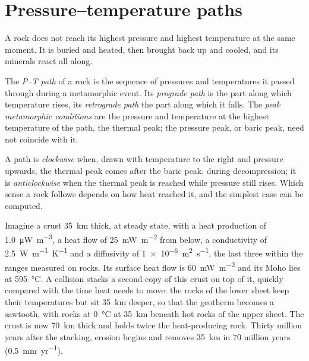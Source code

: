 \section{Pressure--temperature paths}\label{sec:b2:pt-paths:paths}

A rock does not reach its highest pressure and highest temperature at the same moment.
It is buried and heated, then brought back up and cooled, and its minerals react all
along.

\begin{definition}\label{def:b2:pt-paths:paths}
The \emph{P--T path} of a rock is the sequence of pressures and
temperatures it passed through during a metamorphic event. Its \emph{prograde
path} is the part along which temperature rises, its \emph{retrograde
path} the part along which it falls. The \emph{peak metamorphic
conditions} are the pressure and temperature at the
highest temperature of the path, the thermal peak; the pressure peak, or baric peak, need
not coincide with it.
\end{definition}

A path is \emph{clockwise} when, drawn with temperature to the right and pressure upwards,
the thermal peak comes after the baric peak, during decompression; it is
\emph{anticlockwise} when the thermal peak is reached while pressure still rises. Which
sense a rock follows depends on how heat reached it, and the simplest case can be
computed.

Imagine a crust \qty{35}{km} thick, at steady state, with a heat production of
\qty{1.0}{\micro W.m^{-3}}, a heat flow of \qty{25}{mW.m^{-2}} from below, a conductivity
of \qty{2.5}{W.m^{-1}.K^{-1}} and a diffusivity of \qty{1e-6}{m^2.s^{-1}}, the last three
within the ranges measured on rocks. Its surface heat flow is \qty{60}{mW.m^{-2}} and its Moho lies at
\qty{595}{\celsius}. A collision stacks a second copy of this crust on top of it, quickly
compared with the time heat needs to move: the rocks of the lower sheet keep their
temperatures but sit \qty{35}{km} deeper, so that the geotherm becomes a sawtooth, with
rocks at \qty{0}{\celsius} at \qty{35}{km} beneath hot rocks of the upper sheet. The crust is
now \qty{70}{km} thick and holds twice the heat-producing rock. Thirty million years after
the stacking, erosion begins and removes \qty{35}{km} in 70 million years
(\qty{0.5}{mm.yr^{-1}}).

